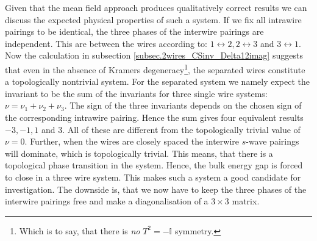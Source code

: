 Given that the mean field approach produces qualitatively correct results we can discuss the expected physical properties of such a system. If we fix all intrawire pairings to be identical, the three phases of the interwire pairings are independent. This are between the wires according to: $1 \leftrightarrow 2, 2 \leftrightarrow 3$ and $3 \leftrightarrow 1$. Now the calculation in subsection \ref{subsec.2wires_CSinv_Delta12imag} suggests that even in the absence of Kramers degeneracy\footnote{Which is to say, that there is \textit{no} $T^2 = -\mathbb{I}$ symmetry.}, the separated wires constitute a topologically nontrivial system. For the separated system we namely expect the invariant to be the sum of the invariants for three single wire systems: $\nu = \nu_1 + \nu_2 + \nu_3$. The sign of the three invariants depends on the chosen sign of the corresponding intrawire pairing. Hence the sum gives four equivalent results $-3, -1, 1$ and $3$. All of these are different from the topologically trivial value of $\nu = 0$. Further, when the wires are closely spaced the interwire $s$-wave pairings will dominate, which is topologically trivial. This means, that there is a topological phase transition in the system. Hence, the bulk energy gap is forced to close in a three wire system. This makes such a system a good candidate for investigation. The downside is, that we now have to keep the three phases of the interwire pairings free and make a diagonalisation of a $3 \times 3$ matrix.  


